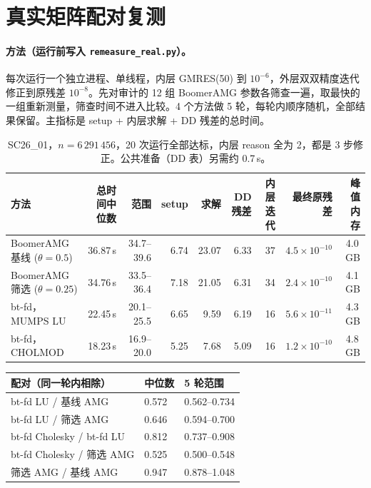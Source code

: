 \documentclass[11pt,a4paper]{ctexart}
\begin{document}
\section{真实矩阵配对复测}
\paragraph{方法（运行前写入 \texttt{remeasure\_real.py}）。}每次运行一个独立进程、单线程，内层 GMRES(50) 到 $10^{-6}$，外层双双精度迭代修正到原残差 $10^{-8}$。先对审计的 12 组 BoomerAMG 参数各筛查一遍，取最快的一组重新测量，筛查时间不进入比较。4 个方法做 5 轮，每轮内顺序随机，全部结果保留。主指标是 setup + 内层求解 + DD 残差的总时间。

\begin{table}[H]
\centering\footnotesize\setlength{\tabcolsep}{4pt}
\begin{tabular}{lrrrrrrrr}
\toprule
方法 & 总时间中位数 & 范围 & setup & 求解 & DD 残差 & 内层迭代 & 最终原残差 & 峰值内存 \\
\midrule
BoomerAMG 基线 ($\theta=0.5$) & 36.87\,s & 34.7--39.6 & 6.74 & 23.07 & 6.33 & 37 & $4.5\times10^{-10}$ & 4.0\,GB \\
BoomerAMG 筛选 ($\theta=0.25$) & 34.76\,s & 33.5--36.4 & 7.18 & 21.05 & 6.31 & 34 & $2.4\times10^{-10}$ & 4.1\,GB \\
bt-fd，MUMPS LU & 22.45\,s & 20.1--25.5 & 6.65 & 9.59 & 6.19 & 16 & $5.6\times10^{-11}$ & 4.3\,GB \\
bt-fd，CHOLMOD & 18.23\,s & 16.9--20.0 & 5.25 & 7.68 & 5.09 & 16 & $1.2\times10^{-10}$ & 4.8\,GB \\
\bottomrule
\end{tabular}
\caption{SC26\_01，$n=6\,291\,456$，20 次运行全部达标，内层 reason 全为 2，都是 3 步修正。公共准备（DD 表）另需约 0.7\,s。}
\end{table}

\begin{table}[H]
\centering\small
\begin{tabular}{lll}
\toprule
配对（同一轮内相除） & 中位数 & 5 轮范围 \\
\midrule
bt-fd LU / 基线 AMG & 0.572 & 0.562--0.734 \\
bt-fd LU / 筛选 AMG & 0.646 & 0.594--0.700 \\
bt-fd Cholesky / bt-fd LU & 0.812 & 0.737--0.908 \\
bt-fd Cholesky / 筛选 AMG & 0.525 & 0.500--0.548 \\
筛选 AMG / 基线 AMG & 0.947 & 0.878--1.048 \\
\bottomrule
\end{tabular}
\end{table}
\end{document}

